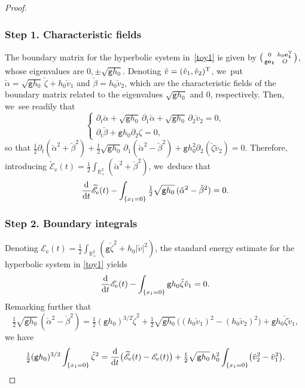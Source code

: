 \documentclass[JEP,XML,SOM,Unicode,NoFloatCountersInSection,published]{cedram}
\newenvironment{smallpmatrix}{\big(\begin{smallmatrix}}{\end{smallmatrix}\big)}
\newcommand{\gr}{{\mathtt g}}
\newcommand{\R}{{\mathbb R}}
\newcommand{\dt}{\partial_t}
\theoremstyle{definition}
\begin{document}
\skpt\begin{proof}\vspace*{-10pt}
\subsubsection*{Step 1. Characteristic fields}
The boundary matrix for the hyperbolic system in~\eqref{toy1} is given by
$\begin{smallpmatrix} 0 & h_0\bf{e}_1^{\rm T} \\ \gr\bf{e}_1 & O\end{smallpmatrix}$, whose eigenvalues are $0, \pm\sqrt{\gr h_0}$.
Denoting $\check{v}=(\check{v}_1,\check{v}_2)^{\rm T}$, we~put $\check{\alpha}=\sqrt{\gr h_0}\,\check{\zeta}+h_0\check{v}_1$ and $\check{\beta} = h_0\check{v}_2$,
which are the characteristic fields of the boundary matrix related to the eigenvalues $\sqrt{\gr h_0}$ and $0$, respectively.
Then, we~see readily that
\[
\begin{cases}
\dt \check{\alpha}+\sqrt{\gr h_0}\,\partial_1 \check{\alpha}+\sqrt{\gr h_0}\,\partial_2 \check{v}_2=0, \\
\dt \check{\beta}+\gr h_0\partial_2 \zeta=0,
\end{cases}
\]
so that
$\tfrac12\dt(\check{\alpha}^2+\check{\beta}^2)+\tfrac12\sqrt{\gr h_0}\,\partial_1(\check{\alpha}^2-\check{\beta}^2)+\gr h_0^2\partial_2(\check{\zeta}\check{v}_2)=0$.
Therefore, introducing $\widetilde{\mathscr E}_\mathrm{e}(t)=\frac{1}{2}\int_{\R^2_+} (\check{\alpha}^2+\check{\beta}^2)$, we~deduce that
\[
\frac{\rm d}{{\rm d}t}\widetilde{\mathscr E}_\mathrm{e}(t)-\int_{\{x_1=0\}}\tfrac12\sqrt{\gr h_0}\,(\check{\alpha}^2-\check{\beta}^2)=0.
\]

\subsubsection*{Step 2. Boundary integrals}
Denoting ${\mathscr E}_\mathrm{e}(t)=\frac{1}{2}\int_{\R_+^2} (\gr \check{\zeta}^2 +h_0 |\check{v}|^2)$,
the standard energy estimate for the hyperbolic system in \eqref{toy1} yields
\[
\frac{\rm d}{{\rm d}t} {\mathscr E}_\mathrm{e}(t) - \int_{\{x_1=0\}}{\gr h_0}\check{\zeta}\check{v}_1 = 0.
\]
Remarking further that
\[
\tfrac{1}{2}\sqrt{\gr h_0}\,(\check{\alpha}^2-\check{\beta}^2)
= \tfrac{1}{2}(\gr h_0)^{3/2} \check{\zeta}^2 + \tfrac{1}{2}\sqrt{\gr h_0}\,\big((h_0 \check{v}_1)^2-(h_0 \check{v}_2)^2\big)+\gr h_0 \check{\zeta}\check{v}_1,
\]
we have
\[
\tfrac{1}{2}(\gr h_0)^{3/2} \int_{\{x_1=0\}} \check{\zeta}^2=\frac{\rm d}{{\rm d}t}\bigl(\widetilde{\mathscr E}_\mathrm{e}(t) - {\mathscr E}_\mathrm{e}(t) \bigr)
+\tfrac{1}{2}\sqrt{\gr h_0}\,h_0^2 \int_{\{x_1=0\}} \bigl(\check{v}_2^2-\check{v}_1^2 \bigr).
\]


\end{proof}
\end{document}
